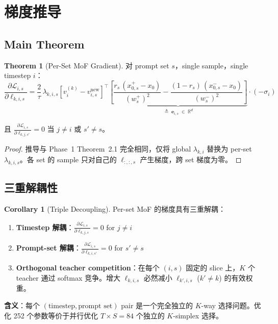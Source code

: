 \documentclass[11pt,a4paper]{article}
\newcommand{\loss}{\mathcal{L}}
\newcommand{\R}{\mathbb{R}}
\theoremstyle{definition}
\newtheorem{corollary}{Corollary}
\newtheorem{theorem}{Theorem}
\begin{document}
\section{梯度推导}
\label{sec:gradient}

\subsection{Main Theorem}

\begin{theorem}[Per-Set MoF Gradient]
\label{thm:per_set_gradient}
对 prompt set $s$，single sample，single timestep $i$：
\begin{equation}
\boxed{
\frac{\partial \loss_{i,s}}{\partial \ell_{k,i,s}} =
\frac{2}{\tau}\,\lambda_{k,i,s}\left[v^{(k)}_i - v^{\mathrm{new}}_{i,s}\right]^\top
\underbrace{\left[\frac{r_s\,(x^+_{0,s} - x_0)}{(w^+_s)^2} - \frac{(1-r_s)\,(x^-_{0,s} - x_0)}{(w^-_s)^2}\right]}_{\triangleq\; \mathbf{e}_{i,s} \;\in\; \R^d}\cdot(-\sigma_i)
}
\label{eq:per_set_gradient}
\end{equation}

且 $\frac{\partial \loss_{i,s}}{\partial \ell_{k,j,s'}} = 0$ 当 $j \neq i$ 或 $s' \neq s$。
\end{theorem}

\begin{proof}
推导与 Phase~1 Theorem~2.1 完全相同，仅将 global $\lambda_{k,i}$ 替换为 per-set $\lambda_{k,i,s}$。各 set 的 sample 只对自己的 $\ell_{:,:,s}$ 产生梯度，跨 set 梯度为零。
\end{proof}

\subsection{三重解耦性}

\begin{corollary}[Triple Decoupling]
\label{cor:triple_decouple}
Per-set MoF 的梯度具有三重解耦：
\begin{enumerate}[leftmargin=1.5em]
\item \textbf{Timestep 解耦}：$\frac{\partial \loss_{i,s}}{\partial \ell_{k,j,s}} = 0$ for $j \neq i$
\item \textbf{Prompt-set 解耦}：$\frac{\partial \loss_{i,s}}{\partial \ell_{k,i,s'}} = 0$ for $s' \neq s$
\item \textbf{Orthogonal teacher competition}：在每个 $(i, s)$ 固定的 slice 上，$K$ 个 teacher 通过 softmax 竞争。增大 $\ell_{k,i,s}$ 必然减小 $\ell_{k',i,s}$ ($k' \neq k$) 的有效权重。
\end{enumerate}

\textbf{含义}：每个 $(\text{timestep}, \text{prompt set})$ pair 是一个完全独立的 $K$-way 选择问题。优化 252 个参数等价于并行优化 $T \times S = 84$ 个独立的 $K$-simplex 选择。
\end{corollary}
\end{document}
